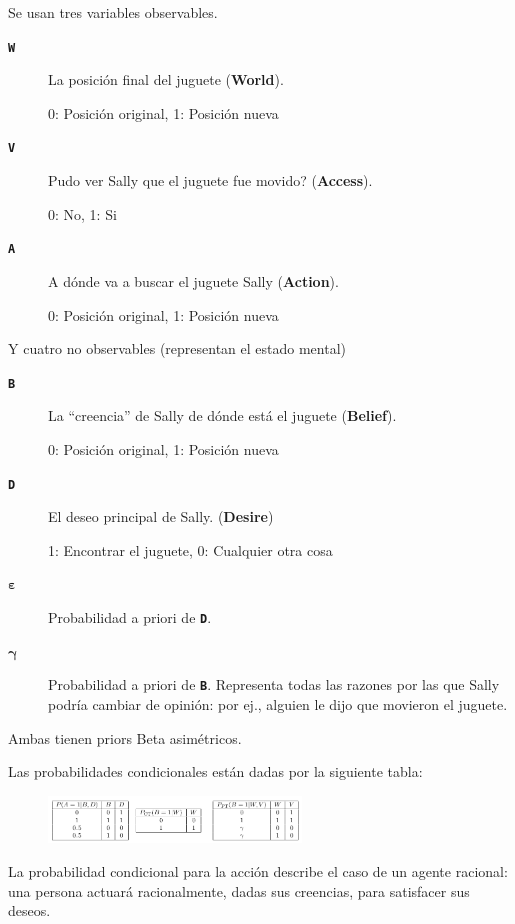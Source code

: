 \documentclass{beamer}
\begin{document}
\begin{frame}
\vspace{1em}
Se usan tres variables observables.
\begin{description}
	\item[\texttt{\textbf{W}}] La posición final del juguete (\textbf{World}). 
	
	0: Posición original, 1: Posición nueva
	\item[\texttt{\textbf{V}}] Pudo ver Sally que el juguete fue movido? (\textbf{Access}).
	
	0: No, 1: Si
	\item[\texttt{\textbf{A}}] A dónde va a buscar el juguete Sally (\textbf{Action}).
	
	0: Posición original, 1: Posición nueva
\end{description}

Y cuatro no observables (representan el estado mental)
\begin{description}
	\item[\texttt{\textbf{B}}] La ``creencia'' de Sally de dónde está el juguete (\textbf{Belief}).
	
	0: Posición original, 1: Posición nueva
	
	\item[\texttt{\textbf{D}}] El deseo principal de Sally. (\textbf{Desire})
	
	1: Encontrar el juguete, 0: Cualquier otra cosa
	
\end{description}
\end{frame}

\begin{frame}
\begin{description}
	\item[\(\boldsymbol{\varepsilon}\)] Probabilidad a priori de \texttt{\textbf{D}}.
	\item[\(\boldsymbol{\gamma}\)] Probabilidad a priori de \texttt{\textbf{B}}. Representa todas las razones por las que Sally podría cambiar de opinión: por ej., alguien le dijo que movieron el juguete.
\end{description}

Ambas tienen priors Beta asimétricos.
\end{frame}

\begin{frame}
Las probabilidades condicionales están dadas por la siguiente tabla:

\begin{figure}[h!]
  \centering
    \includegraphics[width=0.6\textwidth]{imagenes/probabilidades_condicionales.jpg}
\end{figure}


La probabilidad condicional para la acción describe el caso de un agente racional: una persona actuará racionalmente, dadas sus creencias, para satisfacer sus deseos.
\end{frame}
\end{document}
